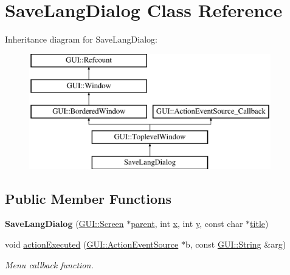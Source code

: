 \hypertarget{classSaveLangDialog}{\section{Save\-Lang\-Dialog Class Reference}
\label{classSaveLangDialog}
}
Inheritance diagram for Save\-Lang\-Dialog\-:\begin{figure}[H]
\begin{center}
\leavevmode
\includegraphics[height=5.000000cm]{classSaveLangDialog}
\end{center}
\end{figure}
\subsection*{Public Member Functions}
\begin{DoxyCompactItemize}
\item 
\hypertarget{classSaveLangDialog_ac2c69e59a4076f106f0d1aeb375e1dd4}{{\bfseries Save\-Lang\-Dialog} (\hyperlink{classGUI_1_1Screen}{G\-U\-I\-::\-Screen} $\ast$\hyperlink{classGUI_1_1Window_a2e593ff65e7702178d82fe9010a0b539}{parent}, int \hyperlink{classGUI_1_1Window_a6ca6a80ca00c9e1d8ceea8d3d99a657d}{x}, int \hyperlink{classGUI_1_1Window_a0ee8e923aff2c3661fc2e17656d37adf}{y}, const char $\ast$\hyperlink{classGUI_1_1ToplevelWindow_a04de191f9a57b5b584657866a4ac6843}{title})}\label{classSaveLangDialog_ac2c69e59a4076f106f0d1aeb375e1dd4}

\item 
\hypertarget{classSaveLangDialog_aebf160f57b67dce3f0dc2ebac87e9f27}{void \hyperlink{classSaveLangDialog_aebf160f57b67dce3f0dc2ebac87e9f27}{action\-Executed} (\hyperlink{classGUI_1_1ActionEventSource}{G\-U\-I\-::\-Action\-Event\-Source} $\ast$b, const \hyperlink{classGUI_1_1String}{G\-U\-I\-::\-String} \&arg)}\label{classSaveLangDialog_aebf160f57b67dce3f0dc2ebac87e9f27}

\begin{DoxyCompactList}\small\item\em Menu callback function. \end{DoxyCompactList}\end{DoxyCompactItemize}
